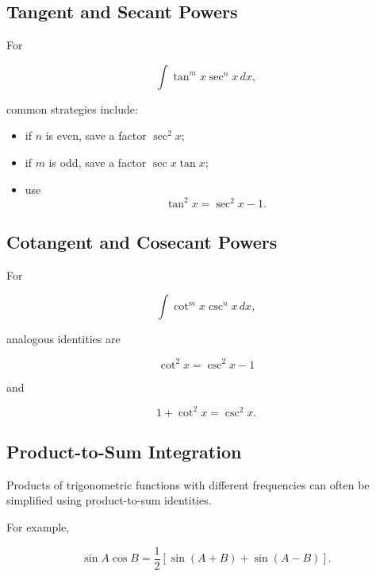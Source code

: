 \subsection{Tangent and Secant Powers}
\label{subsec:tangent-secant-power-integrals}

For

\[
\int\tan^m x\sec^n x\,dx,
\]

common strategies include:

\begin{itemize}
    \item if \(n\) is even, save a factor \(\sec^2x\);
    \item if \(m\) is odd, save a factor \(\sec x\tan x\);
    \item use
    \[
    \tan^2x
    =
    \sec^2x-1.
    \]
\end{itemize}

\subsection{Cotangent and Cosecant Powers}
\label{subsec:cotangent-cosecant-power-integrals}

For

\[
\int\cot^m x\csc^n x\,dx,
\]

analogous identities are

\[
\boxed{
\cot^2x
=
\csc^2x-1
}
\]

and

\[
\boxed{
1+\cot^2x
=
\csc^2x.
}
\]

\subsection{Product-to-Sum Integration}
\label{subsec:product-to-sum-integral-reference}

Products of trigonometric functions with different frequencies can often be
simplified using product-to-sum identities.

For example,

\[
\boxed{
\sin A\cos B
=
\frac12
[
\sin(A+B)+\sin(A-B)
].
}
\]

